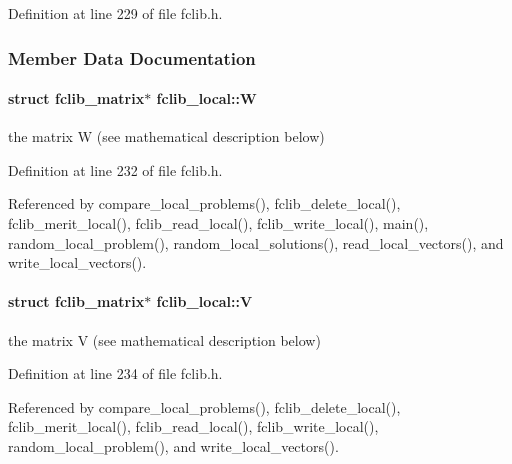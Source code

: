 Definition at line 229 of file fclib.\+h.



\subsubsection{Member Data Documentation}
\hypertarget{structfclib__local_a981b5abb9acf3f99dffe9a05602ad864}{}
\paragraph[{W}]{\setlength{\rightskip}{0pt plus 5cm}struct {\bf fclib\+\_\+matrix}$\ast$ fclib\+\_\+local\+::\+W}\label{structfclib__local_a981b5abb9acf3f99dffe9a05602ad864}


the matrix W (see mathematical description below) 



Definition at line 232 of file fclib.\+h.



Referenced by compare\+\_\+local\+\_\+problems(), fclib\+\_\+delete\+\_\+local(), fclib\+\_\+merit\+\_\+local(), fclib\+\_\+read\+\_\+local(), fclib\+\_\+write\+\_\+local(), main(), random\+\_\+local\+\_\+problem(), random\+\_\+local\+\_\+solutions(), read\+\_\+local\+\_\+vectors(), and write\+\_\+local\+\_\+vectors().

\hypertarget{structfclib__local_a516663ee92260f82283b4933f7e098cf}{}
\paragraph[{V}]{\setlength{\rightskip}{0pt plus 5cm}struct {\bf fclib\+\_\+matrix}$\ast$ fclib\+\_\+local\+::\+V}\label{structfclib__local_a516663ee92260f82283b4933f7e098cf}


the matrix V (see mathematical description below) 



Definition at line 234 of file fclib.\+h.



Referenced by compare\+\_\+local\+\_\+problems(), fclib\+\_\+delete\+\_\+local(), fclib\+\_\+merit\+\_\+local(), fclib\+\_\+read\+\_\+local(), fclib\+\_\+write\+\_\+local(), random\+\_\+local\+\_\+problem(), and write\+\_\+local\+\_\+vectors().

\hypertarget{structfclib__local_ae08751b33a0771d54d48aee48f838ced}{}
